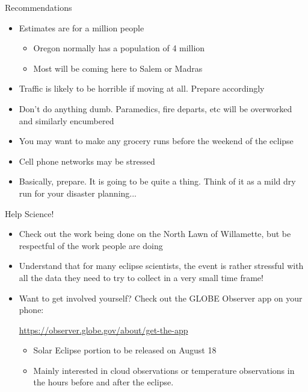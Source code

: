 \documentclass[pdf, aspectratio=169]{beamer}
\begin{document}
\begin{frame}{Recommendations}
	\begin{itemize}
		\item Estimates are for a million people 
			\begin{itemize}
				\item Oregon normally has a population of 4 million
				\item Most will be coming here to Salem or Madras
			\end{itemize}
		\item Traffic is likely to be horrible if moving at all. Prepare accordingly
		\item Don't do anything dumb. Paramedics, fire departs, etc will be overworked and similarly encumbered
		\item You may want to make any grocery runs before the weekend of the eclipse
		\item Cell phone networks may be stressed
		\item Basically, prepare. It is going to be quite a thing. Think of it as a mild dry run for your disaster planning...
	\end{itemize}
\end{frame}

\begin{frame}{Help Science!}
	\begin{itemize}
		\item Check out the work being done on the North Lawn of Willamette, but be respectful of the work people are doing
		\item Understand that for many eclipse scientists, the event is rather stressful with all the data they need to try to collect in a very small time frame!
		\item Want to get involved yourself? Check out the GLOBE Observer app on your phone:
			\begin{center}
				\url{https://observer.globe.gov/about/get-the-app}
			\end{center}
			\begin{itemize}
				\item Solar Eclipse portion to be released on August 18
				\item Mainly interested in cloud observations or temperature observations in the hours before and after the eclipse.
			\end{itemize}
	\end{itemize}
\end{frame}
\end{document}
